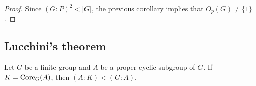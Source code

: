 \begin{proof}
	Since $(G:P)^2<|G|$, the previous corollary implies that 
	$O_p(G)\ne\{1\}$.
\end{proof}




\subsection{Lucchini's theorem}

\begin{theorem}[Lucchini]
	\label{thm:Lucchini}
	Let $G$ be a finite group and $A$ be a proper cyclic subgroup of $G$. If 
	$K=\operatorname{Core}_G(A)$, then $(A:K)<(G:A)$.
\end{theorem}

